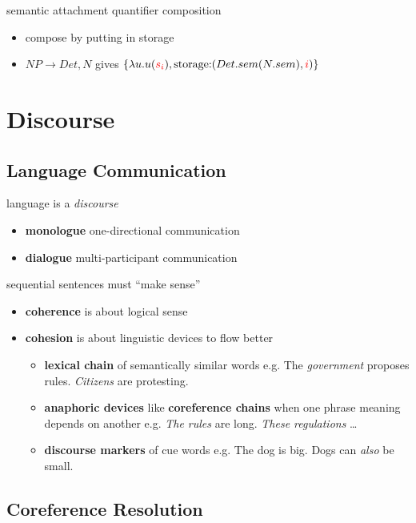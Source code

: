 \documentclass[]{article}
\theoremstyle{definition}
\begin{document}
semantic attachment quantifier composition
\begin{itemize}
    \item compose by putting in storage
    \item $NP \to Det, N$ gives $\{ \lambda u.u(\color{red} s_i \color{black}), \text{storage:} (Det.sem(N.sem), \color{red} i \color{black}) \}$
\end{itemize}


\section{Discourse}%
\label{sec:discourse}

\subsection{Language Communication}%
\label{sub:phrases_of_language}

language is a \textit{discourse}
\begin{itemize}
    \item \textbf{monologue} one-directional communication
    \item \textbf{dialogue} multi-participant communication
\end{itemize}

sequential sentences must ``make sense''
\begin{itemize}
    \item \textbf{coherence} is about logical sense
    \item \textbf{cohesion} is about linguistic devices to flow better
        \begin{itemize}
            \item \textbf{lexical chain} of semantically similar words e.g.  The \textit{government} proposes rules. \textit{Citizens} are protesting.
            \item \textbf{anaphoric devices} like \textbf{coreference chains} when one phrase meaning depends on another e.g.  \textit{The rules} are long. \textit{These regulations} \ldots
            \item \textbf{discourse markers} of cue words e.g. The dog is big. Dogs can \textit{also} be small.
        \end{itemize}
\end{itemize}

\subsection{Coreference Resolution}%
\label{sub:coreference_resolution}
\end{document}
